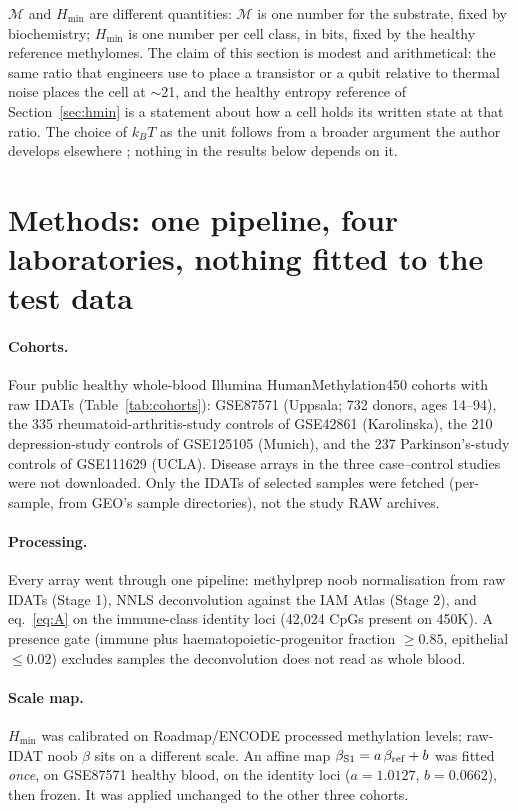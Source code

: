 \documentclass[12pt,a4paper]{article}
\begin{document}
$\mathcal{M}$ and $H_{\min}$ are different quantities: $\mathcal{M}$ is one number for the substrate, fixed by biochemistry; $H_{\min}$ is one number per cell class, in bits, fixed by the healthy reference methylomes. The claim of this section is modest and arithmetical: the same ratio that engineers use to place a transistor or a qubit relative to thermal noise places the cell at $\sim$21, and the healthy entropy reference of Section~\ref{sec:hmin} is a statement about how a cell holds its written state at that ratio. The choice of $k_B T$ as the unit follows from a broader argument the author develops elsewhere \citep{mahaffey2026physicists}; nothing in the results below depends on it.

\section{Methods: one pipeline, four laboratories, nothing fitted to the test data}
\label{sec:methods}

\paragraph{Cohorts.} Four public healthy whole-blood Illumina HumanMethylation450 cohorts with raw IDATs (Table~\ref{tab:cohorts}): GSE87571 (Uppsala; 732 donors, ages 14--94), the 335 rheumatoid-arthritis-study controls of GSE42861 (Karolinska), the 210 depression-study controls of GSE125105 (Munich), and the 237 Parkinson's-study controls of GSE111629 (UCLA). Disease arrays in the three case--control studies were not downloaded. Only the IDATs of selected samples were fetched (per-sample, from GEO's sample directories), not the study RAW archives.

\paragraph{Processing.} Every array went through one pipeline: methylprep noob normalisation from raw IDATs (Stage 1), NNLS deconvolution against the IAM Atlas (Stage 2), and eq.~\ref{eq:A} on the immune-class identity loci (42,024 CpGs present on 450K). A presence gate (immune plus haematopoietic-progenitor fraction $\ge 0.85$, epithelial $\le 0.02$) excludes samples the deconvolution does not read as whole blood.

\paragraph{Scale map.} $H_{\min}$ was calibrated on Roadmap/ENCODE processed methylation levels; raw-IDAT noob $\beta$ sits on a different scale. An affine map $\beta_{\rm S1} = a\,\beta_{\rm ref} + b$ was fitted \emph{once}, on GSE87571 healthy blood, on the identity loci ($a = 1.0127$, $b = 0.0662$), then frozen. It was applied unchanged to the other three cohorts.
\end{document}
